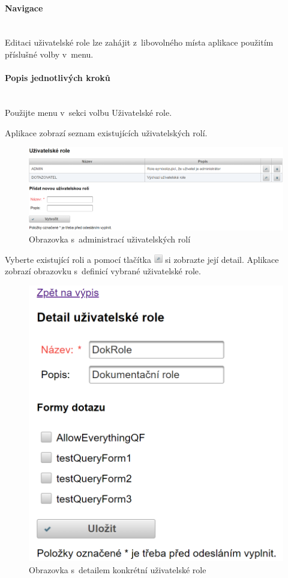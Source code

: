 \documentclass[thesis=M,czech]{FITthesis}[2019/12/23]
\newcommand{\lbparagraph}[1]{\paragraph{#1}\mbox{}\\} %
\newenvironment{reusefigure}[2][htbp]
  {\addtocounter{figure}{-1}%
   \renewcommand{\theHfigure}{dupe-fig}%
   \renewcommand{\thefigure}{\ref{#2}}%
   \renewcommand{\addcontentsline}[3]{}%
   \begin{figure}[#1]}
  {\end{figure}} %
\begin{document}
\lbparagraph{Navigace}
Editaci uživatelské role lze zahájit z~libovolného místa aplikace použitím příslušné volby v~menu.

\lbparagraph{Popis jednotlivých kroků}
Použijte menu v~sekci  volbu Uživatelské role.

Aplikace zobrazí seznam existujících uživatelských rolí.

\begin{reusefigure}[H]{fig:Obrazovka s~administrací uživatelských rolí}
  \includegraphics[width=\textwidth]{res/guide/UserRoles.png}
  \caption{Obrazovka s~administrací uživatelských rolí}
\end{reusefigure}

Vyberte existující roli a pomocí tlačítka \includegraphics[height=1em]{res/guide/SearchIcon.png} si zobrazte její detail.
Aplikace zobrazí obrazovku s~definicí vybrané uživatelské role.

\begin{reusefigure}[H]{fig:Obrazovka s~detailem konkrétní uživatelské role}
  \centering
  \includegraphics[scale=0.60]{res/guide/UserRoleDetail.png}
  \caption{Obrazovka s~detailem konkrétní uživatelské role}
\end{reusefigure}
\end{document}
